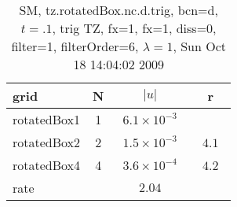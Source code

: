 \begin{table}[hbt]\tableFont %
\begin{center}
\begin{tabular}{|l|c|c|c|} \hline 
grid  & N &  $\vert u \vert$   & r \\ \hline 
         rotatedBox1 &     1 & ~$6.1\times10^{ -3}$~ &            \\ \hline
         rotatedBox2 &     2 & ~$1.5\times10^{ -3}$~ & ~$  4.1$~  \\ \hline
         rotatedBox4 &     4 & ~$3.6\times10^{ -4}$~ & ~$  4.2$~  \\ \hline
    rate             &       &       $2.04$         &        \\ \hline
\end{tabular}
\caption{SM, tz.rotatedBox.nc.d.trig, bcn=d, $t=.1$, trig TZ, fx=1, fx=1, diss=0, filter=1, filterOrder=6, $\lambda=1$,  Sun Oct 18 14:04:02 2009}\label{table:tz.rotatedBox.nc.d.trig}
\end{center}
\end{table}
